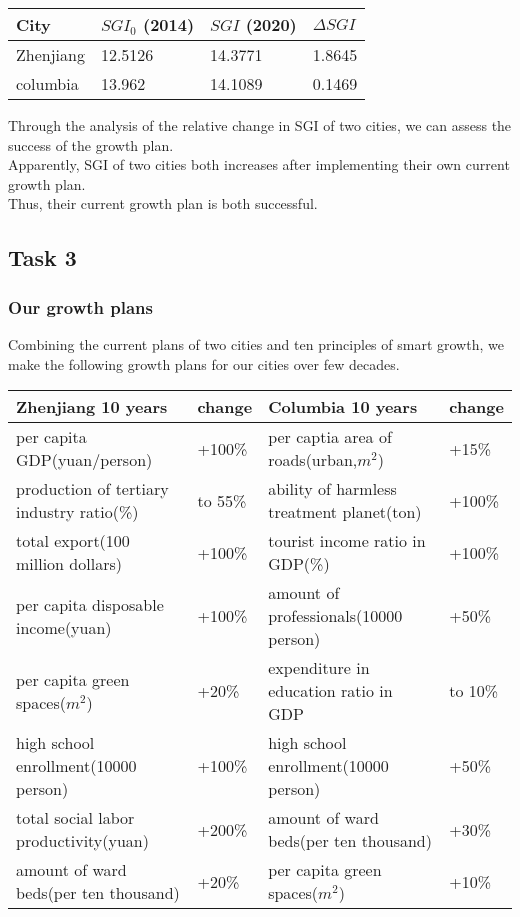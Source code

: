 \documentclass{mcmthesis}
\begin{document}
\begin{table}[h]
\setlength{\abovecaptionskip}{0pt}
\setlength{\belowcaptionskip}{0pt}
\begin{tabular}{p{3.3cm}|p{3cm}|p{3cm}|p{3.3cm}}
\hline
City	& $SGI_0$ (2014)	& $SGI$ (2020)	& $\Delta SGI$ \\
\hline
Zhenjiang	& 12.5126	& 14.3771	& 1.8645 \\
columbia	& 13.962	& 14.1089	& 0.1469 \\
\hline
\end{tabular}
\end{table}
\noindent Through the analysis of the relative change in SGI of two cities, we can assess the success of the growth plan.\\
Apparently, SGI of two cities both increases after implementing their own current growth plan. \\
Thus, their current growth plan is both successful.\\
\subsection{Task 3}%
\subsubsection{Our growth plans}%
Combining the current plans of two cities and ten principles of smart growth, we make the following growth plans for our cities over few decades.\\
\begin{table}[h]
\setlength{\abovecaptionskip}{0pt}
\setlength{\belowcaptionskip}{0pt}
\begin{tabular}{p{5.3cm}|p{1.2cm}|p{5.2cm}|p{1.2cm}}
\hline
\bf Zhenjiang 10 years	& \bf change	 & \bf Columbia 10 years	& \bf change \\
\hline
 per capita GDP(yuan/person)	& +100\%	& per captia area of roads(urban,$m^2$)	& +15\% \\
production of tertiary industry ratio(\%)	& to 55\%	& ability of harmless treatment planet(ton)	& +100\% \\
total export(100 million dollars)	& +100\%	& tourist income ratio in GDP(\%)	& +100\% \\
per capita disposable income(yuan)	& +100\%	& amount of professionals(10000 person)	& +50\% \\
 per capita green spaces($m^2$)	& +20\%	& expenditure in education ratio in GDP	& to 10\% \\
 high school enrollment(10000 person)	& +100\%	& high school enrollment(10000 person)	& +50\% \\
total social labor productivity(yuan)	& +200\%	& amount of ward beds(per ten thousand)	& +30\% \\
amount of ward beds(per ten thousand)	& +20\%	& per capita green spaces($m^2$)	& +10\% \\
\hline
\end{tabular}
\end{table}
\end{document}
